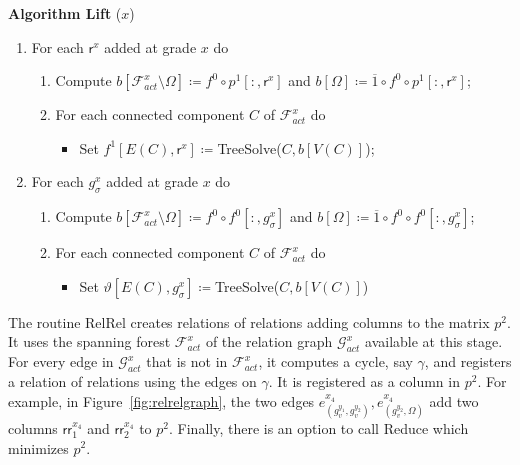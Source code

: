 \documentclass[english,a4paper,nolineno,cleveref]{socg-lipics-v2021}
\newcommand{\G}{\mathcal G}
\newcommand{\F}{\mathcal F}
\def\rsf{\mathsf{r}}
\def\rrsf{\mathsf{rr}}
\begin{document}
\vspace{0.1in}
\noindent
{\bf Algorithm {\sc Lift}} ($x$)
\begin{enumerate}
    \item For each $\rsf^{x}$ added at grade $x$ do
    \begin{enumerate}
        \item Compute $b[\mathcal{F}^x_{act}\setminus\Omega]\coloneqq f^0\circ p^1[:,\rsf^{x}]$ and $b[\Omega]\coloneqq\overline{1}\circ f^0\circ p^1[:,\rsf^{x}]$;
        \item For each connected component $C$ of $\mathcal{F}^x_{act}$ do 
        \begin{itemize}
            \item Set $f^1[E(C),\rsf^{x}]\coloneqq${\sc TreeSolve}($C,b[V(C)]$);
        \end{itemize}

    \end{enumerate}
    \item For each $g^x_\sigma$ added at grade $x$ do
    \begin{enumerate}
        \item Compute $b[\mathcal{F}^x_{act}\setminus\Omega]\coloneqq f^0\circ f^0[:,g_\sigma^x]$ and $b[\Omega]\coloneqq\overline{1}\circ f^0\circ f^0[:,g_\sigma^x]$;
        \item For each connected component $C$ of $\mathcal{F}^x_{act}$ do 
        \begin{itemize}
            \item Set $\vartheta[E(C),g_\sigma^x]\coloneqq${\sc TreeSolve}($C,b[V(C)]$)
        \end{itemize}
    \end{enumerate}
\end{enumerate}


The routine {\sc RelRel} creates relations of relations adding columns to
the matrix $p^2$. It uses the spanning forest $\F_{act}^{x}$ of
the relation graph $\G_{act}^{x}$ available
at this stage. For every edge in $\G_{act}^{x}$ that is not in
$\F_{act}^{x}$, it computes a cycle, say $\gamma$, and
registers a relation of relations using the edges on $\gamma$. It is registered as a column
in $p^2$. For example, in Figure~\ref{fig:relrelgraph}, the two edges
$e^{x_4}_{(g_v^{y_1},g_v^{y_2})},
e^{x_4}_{(g_v^{y_2},\Omega)}$ add two columns $\rrsf_1^{x_4}$ and $\rrsf_2^{x_4}$
to $p^2$.
Finally, there is an option to call {\sc Reduce} which minimizes $p^2$.
\end{document}
